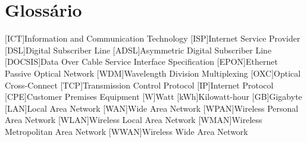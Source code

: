 \chapter{Glossário}

\footnotesize
\SingleSpacing

\begin{multicols}{2}
\begin{acronym}[AAAAAA]

	[ICT]{Information and Communication Technology}
	[ISP]{Internet Service Provider}
	[DSL]{Digital Subscriber Line}
	[ADSL]{Asymmetric Digital Subscriber Line}
	[DOCSIS]{Data Over Cable Service Interface Specification}
	[EPON]{Ethernet Passive Optical Network}
	[WDM]{Wavelength Division Multiplexing}
	[OXC]{Optical Cross-Connect}
	[TCP]{Transmission Control Protocol}
	[IP]{Internet Protocol}
	[CPE]{Customer Premises Equipment}
	{Watt}
	[kWh]{Kilowatt-hour}
	[GB]{Gigabyte}
	[LAN]{Local Area Network}
	[WAN]{Wide Area Network}
	[WPAN]{Wireless Personal Area Network}
	[WLAN]{Wireless Local Area Network}
	[WMAN]{Wireless Metropolitan Area Network}
	[WWAN]{Wireless Wide Area Network}

\end{acronym}
\end{multicols}

